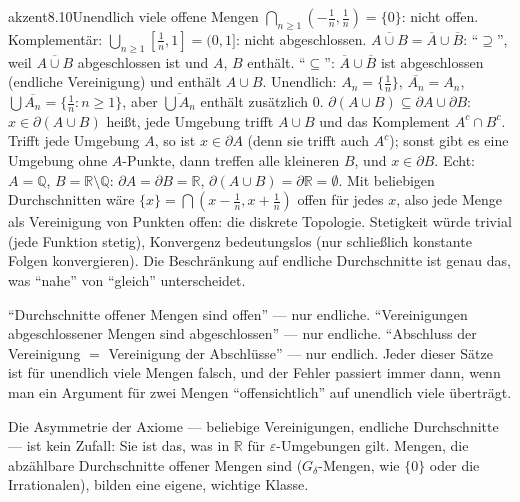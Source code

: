 \begin{loesungkarte}{akzent}{8.10}{Unendlich viele offene Mengen}
$\bigcap_{n\ge1}(-\frac1n, \frac1n) = \{0\}$: nicht offen. Komplementär: $\bigcup_{n\ge1}[\frac1n, 1] = (0, 1]$: nicht abgeschlossen.
$\overline{A\cup B} = \overline A\cup\overline B$: \enquote{$\supseteq$}, weil $\overline{A\cup B}$ abgeschlossen ist und $A$, $B$ enthält. \enquote{$\subseteq$}: $\overline A\cup\overline B$ ist abgeschlossen (endliche Vereinigung) und enthält $A\cup B$. Unendlich: $A_n = \{\frac1n\}$, $\overline{A_n} = A_n$, $\bigcup\overline{A_n} = \{\frac1n\colon n\ge1\}$, aber $\overline{\bigcup A_n}$ enthält zusätzlich $0$.
$\partial(A\cup B)\subseteq\partial A\cup\partial B$: $x\in\partial(A\cup B)$ heißt, jede Umgebung trifft $A\cup B$ und das Komplement $A^{c}\cap B^{c}$. Trifft jede Umgebung $A$, so ist $x\in\partial A$ (denn sie trifft auch $A^{c}$); sonst gibt es eine Umgebung ohne $A$-Punkte, dann treffen alle kleineren $B$, und $x\in\partial B$. Echt: $A = \mathbb Q$, $B = \mathbb R\setminus\mathbb Q$: $\partial A = \partial B = \mathbb R$, $\partial(A\cup B) = \partial\mathbb R = \emptyset$.
Mit beliebigen Durchschnitten wäre $\{x\} = \bigcap(x - \frac1n, x + \frac1n)$ offen für jedes $x$, also jede Menge als Vereinigung von Punkten offen: die diskrete Topologie. Stetigkeit würde trivial (jede Funktion stetig), Konvergenz bedeutungslos (nur schließlich konstante Folgen konvergieren). Die Beschränkung auf endliche Durchschnitte ist genau das, was \enquote{nahe} von \enquote{gleich} unterscheidet.
\begin{fehler}\kastentext
\enquote{Durchschnitte offener Mengen sind offen} --- nur endliche. \enquote{Vereinigungen abgeschlossener Mengen sind abgeschlossen} --- nur endliche. \enquote{Abschluss der Vereinigung $=$ Vereinigung der Abschlüsse} --- nur endlich. Jeder dieser Sätze ist für unendlich viele Mengen falsch, und der Fehler passiert immer dann, wenn man ein Argument für zwei Mengen \enquote{offensichtlich} auf unendlich viele überträgt.
\end{fehler}
\begin{mitnehmen}\kastentext
Die Asymmetrie der Axiome --- beliebige Vereinigungen, endliche Durchschnitte --- ist kein Zufall: Sie ist das, was in $\mathbb R$ für $\varepsilon$-Umgebungen gilt. Mengen, die abzählbare Durchschnitte offener Mengen sind ($G_\delta$-Mengen, wie $\{0\}$ oder die Irrationalen), bilden eine eigene, wichtige Klasse.
\end{mitnehmen}
\end{loesungkarte}

